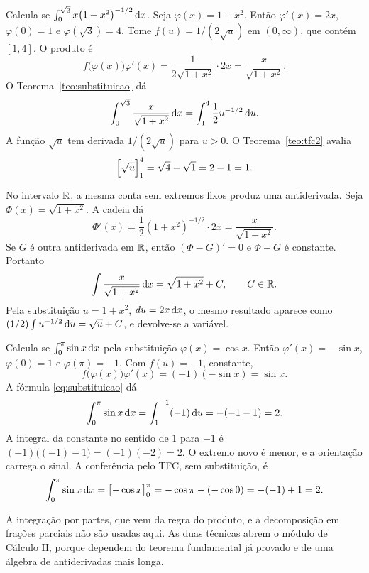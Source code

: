 \documentclass[11pt,a4paper]{article}
\begin{document}
\begin{exemplo}
Calcula-se $\int_0^{\sqrt{3}} x\bigl(1+x^2\bigr)^{-1/2}\,\mathrm{d} x$. Seja $\varphi(x)=1+x^2$. Então $\varphi'(x)=2x$, $\varphi(0)=1$ e $\varphi(\sqrt{3})=4$. Tome $f(u)=1/(2\sqrt{u})$ em $(0,\infty)$, que contém $[1,4]$. O produto é
\[
f\bigl(\varphi(x)\bigr)\varphi'(x)=\frac{1}{2\sqrt{1+x^2}}\cdot 2x=\frac{x}{\sqrt{1+x^2}}.
\]
O Teorema~\ref{teo:substituicao} dá
\[
\int_0^{\sqrt{3}}\frac{x}{\sqrt{1+x^2}}\,\mathrm{d} x
=\int_1^4\frac{1}{2}u^{-1/2}\,\mathrm{d} u.
\]
A função $\sqrt{u}$ tem derivada $1/(2\sqrt{u})$ para $u>0$. O Teorema~\ref{teo:tfc2} avalia
\[
\Bigl[\sqrt{u}\Bigr]_1^4=\sqrt{4}-\sqrt{1}=2-1=1.
\]
\end{exemplo}

\begin{exemplo}
No intervalo $\mathbb{R}$, a mesma conta sem extremos fixos produz uma antiderivada. Seja $\Phi(x)=\sqrt{1+x^2}$. A cadeia dá
\[
\Phi'(x)=\frac{1}{2}(1+x^2)^{-1/2}\cdot 2x=\frac{x}{\sqrt{1+x^2}}.
\]
Se $G$ é outra antiderivada em $\mathbb{R}$, então $(\Phi-G)'=0$ e $\Phi-G$ é constante. Portanto
\[
\int\frac{x}{\sqrt{1+x^2}}\,\mathrm{d} x=\sqrt{1+x^2}+C,\qquad C\in\mathbb{R}.
\]
Pela substituição $u=1+x^2$, $du=2x\,\mathrm{d} x$, o mesmo resultado aparece como $(1/2)\int u^{-1/2}\,\mathrm{d} u=\sqrt{u}+C$, e devolve-se a variável.
\end{exemplo}

\begin{exemplo}
Calcula-se $\int_0^{\pi}\sin x\,\mathrm{d} x$ pela substituição $\varphi(x)=\cos x$. Então $\varphi'(x)=-\sin x$, $\varphi(0)=1$ e $\varphi(\pi)=-1$. Com $f(u)=-1$, constante,
\[
f\bigl(\varphi(x)\bigr)\varphi'(x)=(-1)(-\sin x)=\sin x.
\]
A fórmula \eqref{eq:substituicao} dá
\[
\int_0^{\pi}\sin x\,\mathrm{d} x=\int_1^{-1}(-1)\,\mathrm{d} u=-(-1-1)=2.
\]
A integral da constante no sentido de $1$ para $-1$ é $(-1)\bigl((-1)-1\bigr)=(-1)(-2)=2$. O extremo novo é menor, e a orientação carrega o sinal. A conferência pelo TFC, sem substituição, é
\[
\int_0^{\pi}\sin x\,\mathrm{d} x=\bigl[-\cos x\bigr]_0^{\pi}=-\cos\pi-(-\cos 0)=-(-1)+1=2.
\]
\end{exemplo}

\begin{observacao}
A integração por partes, que vem da regra do produto, e a decomposição em frações parciais não são usadas aqui. As duas técnicas abrem o módulo de Cálculo II, porque dependem do teorema fundamental já provado e de uma álgebra de antiderivadas mais longa.
\end{observacao}
\end{document}
